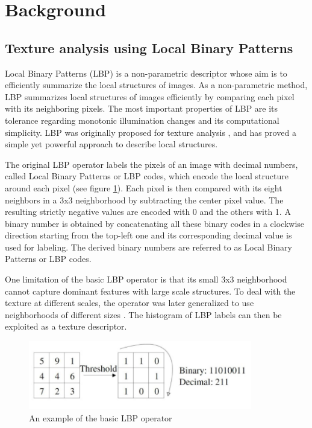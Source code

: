 \documentclass[runningheads,a4paper]{llncs}
\begin{document}
\section{Background}
\subsection{Texture analysis using Local Binary Patterns}
Local Binary Patterns (LBP) \cite{Huang2011} is a non-parametric descriptor whose aim is to efficiently summarize the local structures of images. As a non-parametric method, LBP summarizes local structures of images efficiently by comparing each pixel with its neighboring pixels. The most important properties of LBP are its tolerance regarding monotonic illumination changes and its computational simplicity. LBP was originally proposed for texture analysis \cite{Ojala1996}, and has proved a simple yet powerful approach to describe local structures. 

The original LBP operator labels the pixels of an image with
decimal numbers, called Local Binary Patterns or LBP codes, which encode the local structure around each pixel (see figure \ref{fig:lbp}). Each pixel is then compared with its eight neighbors in a 3x3 neighborhood by subtracting the center pixel value. The resulting strictly negative values are encoded with 0 and the others with 1. A binary number is obtained by concatenating all these binary codes in a clockwise direction starting from the top-left one and its corresponding decimal value is used for labeling. The derived binary numbers are referred to as Local Binary Patterns or LBP codes. 

One limitation of the basic LBP operator is that its small 3x3 neighborhood cannot capture dominant features with large scale structures. To deal with the texture at different scales, the operator was later generalized to use neighborhoods of different sizes \cite{Ojala}. The histogram of LBP labels can then be exploited as a texture descriptor.

\begin{figure}[h]
\centering
\includegraphics[height=3cm]{fig/LBP.png}
\caption{An example of the basic LBP operator}
\label{fig:lbp}
\end{figure}
\end{document}
